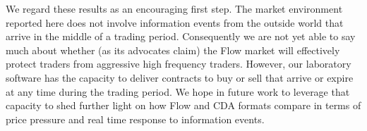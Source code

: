 We regard these results as an encouraging first step.
The market environment reported here 
does not involve information events from the outside world that arrive 
in the middle of a trading period.
Consequently we are not yet able to say much about whether 
(as its advocates claim)
the Flow market will effectively protect traders from aggressive high frequency traders. 
However, our laboratory software has the capacity to deliver contracts to buy or sell that arrive or expire at any time during the trading period.
We hope in future work to leverage that capacity to shed further light on how Flow and CDA formats compare in terms of price pressure and real time response to information events.










\pagebreak
\begin{singlespace}



\pagebreak
\end{singlespace}
\clearpage


